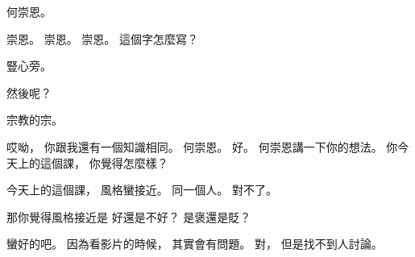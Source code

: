 \hypertarget{w01:cue:3270}{}何崇恩。

\hypertarget{w01:cue:3271}{}崇恩。
\hypertarget{w01:cue:3272}{}崇恩。
\hypertarget{w01:cue:3273}{}崇恩。
\hypertarget{w01:cue:3274}{}這個字怎麼寫？

\hypertarget{w01:cue:3275}{}豎心旁。

\hypertarget{w01:cue:3276}{}然後呢？

\hypertarget{w01:cue:3277}{}宗教的宗。

\hypertarget{w01:cue:3278}{}哎呦，
\hypertarget{w01:cue:3279}{}你跟我還有一個知識相同。
\hypertarget{w01:cue:3280}{}何崇恩。
\hypertarget{w01:cue:3281}{}好。
\hypertarget{w01:cue:3282}{}何崇恩講一下你的想法。
\hypertarget{w01:cue:3283}{}你今天上的這個課，
\hypertarget{w01:cue:3284}{}你覺得怎麼樣？

\hypertarget{w01:cue:3285}{}今天上的這個課，
\hypertarget{w01:cue:3286}{}風格蠻接近。
\hypertarget{w01:cue:3287}{}同一個人。
\hypertarget{w01:cue:3288}{}對不了。

\hypertarget{w01:cue:3289}{}那你覺得風格接近是
\hypertarget{w01:cue:3290}{}好還是不好？
\hypertarget{w01:cue:3291}{}是褒還是貶？

\hypertarget{w01:cue:3292}{}蠻好的吧。
\hypertarget{w01:cue:3293}{}因為看影片的時候，
\hypertarget{w01:cue:3294}{}其實會有問題。
\hypertarget{w01:cue:3295}{}對，
\hypertarget{w01:cue:3296}{}但是找不到人討論。

